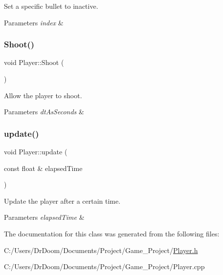 Set a specific bullet to inactive. 


\begin{DoxyParams}{Parameters}
{\em index} & \\
\hline
\end{DoxyParams}
\mbox{\label{class_player_a2105394431517a41d38140cb65982331}} 
\subsubsection{\texorpdfstring{Shoot()}{Shoot()}}
{\footnotesize\ttfamily void Player\+::\+Shoot (\begin{DoxyParamCaption}{ }\end{DoxyParamCaption})}



Allow the player to shoot. 


\begin{DoxyParams}{Parameters}
{\em dt\+As\+Seconds} & \\
\hline
\end{DoxyParams}
\mbox{\label{class_player_aaccee569406f6180bd5028d058b8579f}} 
\subsubsection{\texorpdfstring{update()}{update()}}
{\footnotesize\ttfamily void Player\+::update (\begin{DoxyParamCaption}\item[{const float \&}]{elapsed\+Time }\end{DoxyParamCaption})}



Update the player after a certain time. 


\begin{DoxyParams}{Parameters}
{\em elapsed\+Time} & \\
\hline
\end{DoxyParams}


The documentation for this class was generated from the following files\+:\begin{DoxyCompactItemize}
\item 
C\+:/\+Users/\+Dr\+Doom/\+Documents/\+Project/\+Game\+\_\+\+Project/\hyperlink{_player_8h}{Player.\+h}\item 
C\+:/\+Users/\+Dr\+Doom/\+Documents/\+Project/\+Game\+\_\+\+Project/Player.\+cpp\end{DoxyCompactItemize}
